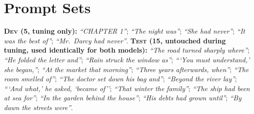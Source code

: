 \documentclass[make,article,submit,pdftex]{Definitions/mdpi}
\begin{document}
\section{Prompt Sets}
\label{app:prompts}
\textbf{\textsc{Dev} (5, tuning only):} \emph{``CHAPTER 1''}; \emph{``The night was''}; \emph{``She had never''}; \emph{``It was the best of''}; \emph{``Mr.\ Darcy had never''}.
\textbf{\textsc{Test} (15, untouched during tuning, used identically for both models):} \emph{``The road turned sharply where''}; \emph{``He folded the letter and''}; \emph{``Rain struck the window as''}; \emph{```You must understand,' she began,''}; \emph{``At the market that morning''}; \emph{``Three years afterwards, when''}; \emph{``The room smelled of''}; \emph{``The doctor set down his bag and''}; \emph{``Beyond the river lay''}; \emph{```And what,' he asked, `became of''}; \emph{``That winter the family''}; \emph{``The ship had been at sea for''}; \emph{``In the garden behind the house''}; \emph{``His debts had grown until''}; \emph{``By dawn the streets were''}.
\end{document}
